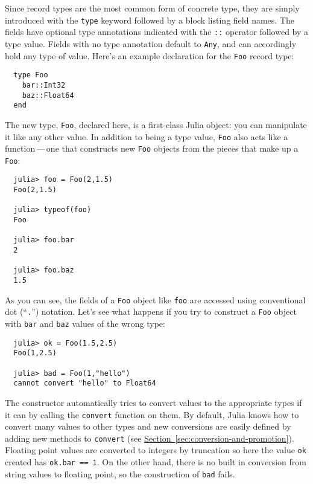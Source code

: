 \documentclass{article}
\newcommand{\Section}[1]{\hyperref[sec:#1]{Section~\ref*{sec:#1}}}
\begin{document}
Since record types are the most common form of concrete type, they are simply introduced with the \verb|type| keyword followed by a block listing field names.
The fields have optional type annotations indicated with the \verb|::| operator followed by a type value.
Fields with no type annotation default to \verb|Any|, and can accordingly hold any type of value.
Here's an example declaration for the \verb|Foo| record type:
\begin{verbatim}
  type Foo
    bar::Int32
    baz::Float64
  end
\end{verbatim}
The new type, \verb|Foo|, declared here, is a first-class Julia object:
you can manipulate it like any other value.
In addition to being a type value, \verb|Foo| also acts like a function\,---\,one that constructs new \verb|Foo| objects from the pieces that make up a \verb|Foo|:
\begin{verbatim}
  julia> foo = Foo(2,1.5)
  Foo(2,1.5)

  julia> typeof(foo)
  Foo

  julia> foo.bar
  2

  julia> foo.baz
  1.5
\end{verbatim}
As you can see, the fields of a \verb|Foo| object like \verb|foo| are accessed using conventional dot (``\verb|.|'') notation.
Let's see what happens if you try to construct a \verb|Foo| object with \verb|bar| and \verb|baz| values of the wrong type:
\begin{verbatim}
  julia> ok = Foo(1.5,2.5)
  Foo(1,2.5)

  julia> bad = Foo(1,"hello")
  cannot convert "hello" to Float64
\end{verbatim}
The constructor automatically tries to convert values to the appropriate types if it can by calling the \verb|convert| function on them.
By default, Julia knows how to convert many values to other types and new conversions are easily defined by adding new methods to \verb|convert| (see \Section{conversion-and-promotion}).
Floating point values are converted to integers by truncation so here the value \verb|ok| created has \verb|ok.bar == 1|.
On the other hand, there is no built in conversion from string values to floating point, so the construction of \verb|bad| fails.
\end{document}

